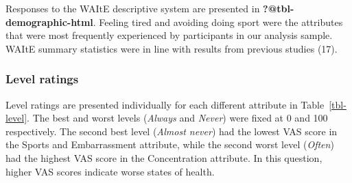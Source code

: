 \documentclass[
  letterpaper,
  DIV=11,
  numbers=noendperiod]{scrartcl}
\begin{document}
Responses to the WAItE descriptive system are presented in
\textbf{?@tbl-demographic-html}. Feeling tired and avoiding doing sport
were the attributes that were most frequently experienced by
participants in our analysis sample. WAItE summary statistics were in
line with results from previous studies (17).

\subsubsection{Level ratings}\label{level-ratings-1}

Level ratings are presented individually for each different attribute in
Table~\ref{tbl-level}. The best and worst levels (\emph{Always} and
\emph{Never}) were fixed at 0 and 100 respectively. The second best
level (\emph{Almost never}) had the lowest VAS score in the Sports and
Embarrassment attribute, while the second worst level (\emph{Often}) had
the highest VAS score in the Concentration attribute. In this question,
higher VAS scores indicate worse states of health.

\newpage
\end{document}
